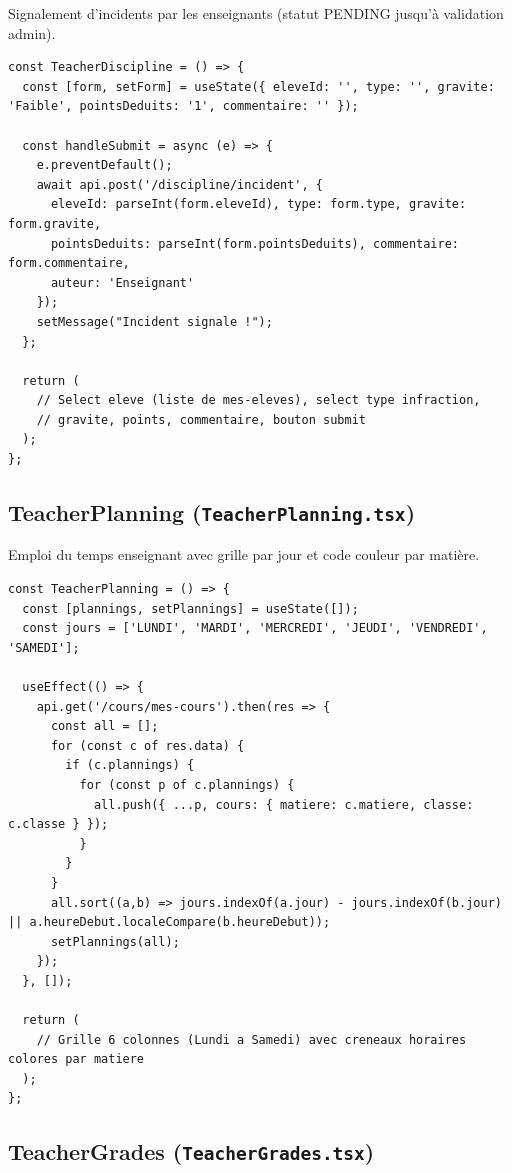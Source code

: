 \documentclass[12pt,a4paper]{article}
\begin{document}
Signalement d'incidents par les enseignants (statut PENDING jusqu'à validation admin).

\begin{lstlisting}[style=code]
const TeacherDiscipline = () => {
  const [form, setForm] = useState({ eleveId: '', type: '', gravite: 'Faible', pointsDeduits: '1', commentaire: '' });

  const handleSubmit = async (e) => {
    e.preventDefault();
    await api.post('/discipline/incident', {
      eleveId: parseInt(form.eleveId), type: form.type, gravite: form.gravite,
      pointsDeduits: parseInt(form.pointsDeduits), commentaire: form.commentaire,
      auteur: 'Enseignant'
    });
    setMessage("Incident signale !");
  };

  return (
    // Select eleve (liste de mes-eleves), select type infraction,
    // gravite, points, commentaire, bouton submit
  );
};
\end{lstlisting}

\subsection{TeacherPlanning (\texttt{TeacherPlanning.tsx})}

Emploi du temps enseignant avec grille par jour et code couleur par matière.

\begin{lstlisting}[style=code]
const TeacherPlanning = () => {
  const [plannings, setPlannings] = useState([]);
  const jours = ['LUNDI', 'MARDI', 'MERCREDI', 'JEUDI', 'VENDREDI', 'SAMEDI'];

  useEffect(() => {
    api.get('/cours/mes-cours').then(res => {
      const all = [];
      for (const c of res.data) {
        if (c.plannings) {
          for (const p of c.plannings) {
            all.push({ ...p, cours: { matiere: c.matiere, classe: c.classe } });
          }
        }
      }
      all.sort((a,b) => jours.indexOf(a.jour) - jours.indexOf(b.jour) || a.heureDebut.localeCompare(b.heureDebut));
      setPlannings(all);
    });
  }, []);

  return (
    // Grille 6 colonnes (Lundi a Samedi) avec creneaux horaires colores par matiere
  );
};
\end{lstlisting}

\subsection{TeacherGrades (\texttt{TeacherGrades.tsx})}
\end{document}
